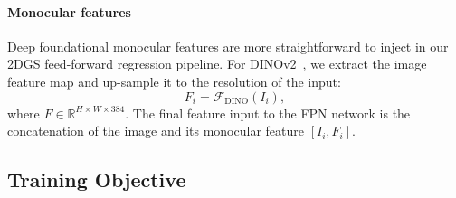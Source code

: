 \paragraph{Monocular features} 
Deep foundational monocular features are more straightforward to inject in our 2DGS feed-forward regression pipeline. For DINOv2~\cite{oquab2023dinov2}, we extract the image feature map and up-sample it to the resolution of the input:
\begin{equation}
F_{i} = \mathcal{F}_{\text{DINO}}(I_{i}),
\end{equation}
where $F\in\mathbb{R}^{H\times W \times 384}$. The final feature input to the FPN network is the concatenation of the image and its monocular feature $[I_i,F_i]$.





\subsection{Training Objective} 
\label{losses}

